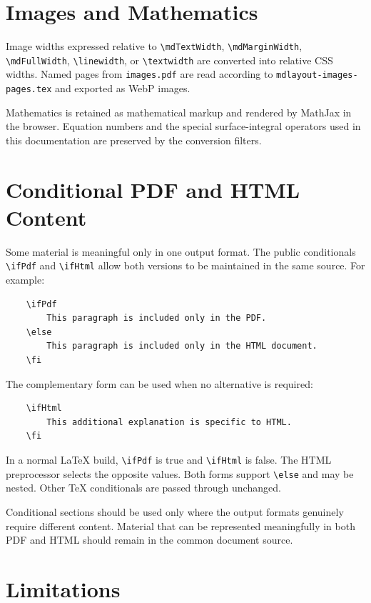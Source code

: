 \documentclass[
11pt,
a4paper,
oneside
]{scrbook}
\begin{document}
{\section{Images and Mathematics}

Image widths expressed relative to \verb|\mdTextWidth|,
\verb|\mdMarginWidth|, \verb|\mdFullWidth|, \verb|\linewidth|, or
\verb|\textwidth| are converted into relative CSS widths. Named pages from
\texttt{images.pdf} are read according to \texttt{mdlayout-images-pages.tex}
and exported as WebP images.

Mathematics is retained as mathematical markup and rendered by MathJax in the
browser. Equation numbers and the special surface-integral operators used in
this documentation are preserved by the conversion filters.

\section{Conditional PDF and HTML Content}

Some material is meaningful only in one output format. The public conditionals
\verb|\ifPdf| and \verb|\ifHtml| allow both versions to be maintained in the
same source. For example:

\begin{verbatim}
	\ifPdf
		This paragraph is included only in the PDF.
	\else
		This paragraph is included only in the HTML document.
	\fi
\end{verbatim}

The complementary form can be used when no alternative is required:

\begin{verbatim}
	\ifHtml
		This additional explanation is specific to HTML.
	\fi
\end{verbatim}

In a normal \LaTeX{} build, \verb|\ifPdf| is true and \verb|\ifHtml| is
false. The HTML preprocessor selects the opposite values. Both forms support
\verb|\else| and may be nested. Other TeX conditionals are passed through
unchanged.

\begin{note}
	Conditional sections should be used only where the output formats genuinely
	require different content. Material that can be represented meaningfully in
	both PDF and HTML should remain in the common document source.
\end{note}

\section{Limitations}

}
\end{document}
